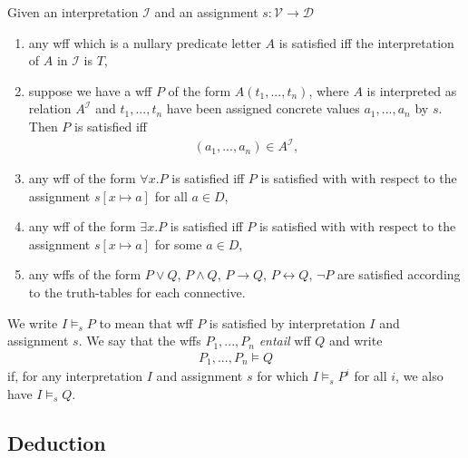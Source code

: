 \documentclass{article}
\begin{document}
\begin{definition}[Satisfaction]
    Given an interpretation $\mathcal{I}$ and an assignment $s:\mathcal{V}\to\mathcal{D}$
    \begin{enumerate}
        \item any wff which is a nullary predicate letter $A$ is satisfied iff the
              interpretation of $A$ in $\mathcal{I}$ is $T$,
        \item suppose we have a wff $P$ of the form $A(t_1,..., t_n)$, where $A$ is
              interpreted as relation $A^\mathcal{I}$ and $t_1,...,t_n$ have been assigned
              concrete values $a_1,...,a_n$ by $s$. Then $P$ is satisfied iff \begin{align*}
                  (a_1,...,a_n)\in A^\mathcal{I},
              \end{align*}
        \item any wff of the form $\forall x.P$ is satisfied iff $P$ is satisfied with
              with respect to the assignment $s[x\mapsto a]$ for all $a\in D$,
        \item any wff of the form $\exists x.P$ is satisfied iff $P$ is satisfied with
              with respect to the assignment $s[x\mapsto a]$ for some $a\in D$,
        \item any wffs of the form $P\vee Q$, $P\wedge Q$, $P\rightarrow Q$, $P\leftrightarrow Q$,
              $\neg P$ are satisfied according to the truth-tables for each connective.
    \end{enumerate}
\end{definition}

\begin{definition}[Entailment]
    We write $I\vDash_s P$ to mean that wff $P$ is satisfied by interpretation $I$ and
    assignment $s$.  We say that the wffs $P_1,...,P_n$ \emph{entail} wff $Q$ and write
    \begin{align*}
        P_1,...,P_n\vDash Q
    \end{align*}
    if, for any interpretation $I$ and assignment $s$ for which $I\vDash_s P^i$ for all $i$,
    we also have $I\vDash_s Q$.
\end{definition}

\subsection{Deduction}
\end{document}
